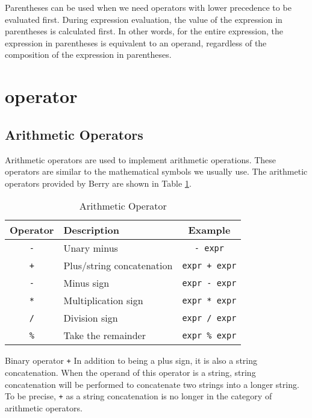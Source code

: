 Parentheses can be used when we need operators with lower precedence to be evaluated first. During expression evaluation, the value of the expression in parentheses is calculated first. In other words, for the entire expression, the expression in parentheses is equivalent to an operand, regardless of the composition of the expression in parentheses.

\section {operator}

\subsection {Arithmetic Operators}

Arithmetic operators are used to implement arithmetic operations. These operators are similar to the mathematical symbols we usually use. The arithmetic operators provided by Berry are shown in Table \ref{tab::arthmetic_operator}.

\begin{table}[htb]
    \centering
    \setlength{\tabcolsep}{10mm}
    \begin{tabular}{clc} \toprule
        \textbf{Operator} & \textbf{Description} & \textbf{Example} \\ \midrule
        \texttt{-} & Unary minus & \texttt{- expr} \\
        \texttt{+} & Plus/string concatenation & \texttt{expr + expr} \\
        \texttt{-} & Minus sign & \texttt{expr - expr} \\
        \texttt{*} & Multiplication sign & \texttt{expr * expr} \\
        \texttt{/} & Division sign & \texttt{expr / expr} \\
        \texttt{\%} & Take the remainder & \texttt{expr \% expr} \\
        \bottomrule
    \end{tabular}
    \caption{Arithmetic Operator}
    \label{tab::arthmetic_operator}
\end{table}

Binary operator \texttt{+} In addition to being a plus sign, it is also a string concatenation. When the operand of this operator is a string, string concatenation will be performed to concatenate two strings into a longer string. To be precise, \texttt{+} as a string concatenation is no longer in the category of arithmetic operators.

